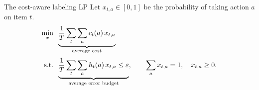 
\begin{frame}{The cost-aware labeling LP}
  Let $x_{t,a}\in[0,1]$ be the probability of taking action $a$ on item $t$.
  \[
  \begin{aligned}
    \min_{x}\;\; & \underbrace{\frac1T\sum_{t}\sum_{a} c_t(a)\,x_{t,a}}_{\text{average cost}}\\[2pt]
    \text{s.t.}\;\; & \underbrace{\frac1T\sum_{t}\sum_{a} h_t(a)\,x_{t,a}\le \varepsilon}_{\text{average error budget}}, \qquad
    \sum_{a} x_{t,a}=1,\quad x_{t,a}\ge 0.
  \end{aligned}
  \]
  \vfill
\end{frame}

